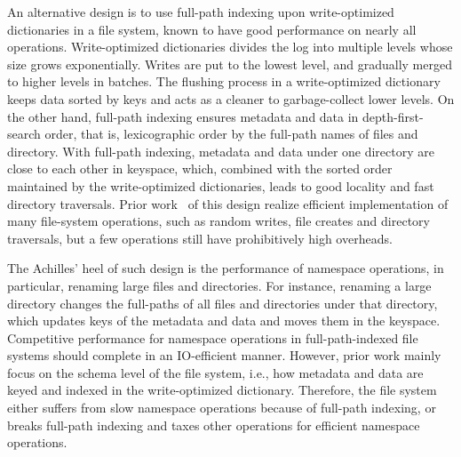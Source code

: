 An alternative design is to use full-path indexing upon write-optimized
dictionaries in a file system, known to have good performance on nearly all
operations.
Write-optimized dictionaries divides the log into multiple levels whose size
grows exponentially.
Writes are put to the lowest level, and gradually merged to higher levels in
batches.
The flushing process in a write-optimized dictionary keeps data sorted by keys
and acts as a cleaner to garbage-collect lower levels.
On the other hand, full-path indexing ensures metadata and data in
depth-first-search order, that is, lexicographic order by the full-path names
of files and directory.
With full-path indexing, metadata and data under one directory are close to each
other in keyspace, which, combined with the sorted order maintained by the
write-optimized dictionaries, leads to good locality and fast directory
traversals.
Prior work~\citep{betrfs1,betrfs1tos,betrfs2,betrfs2tos,betrfs3} of this design
realize efficient implementation of many file-system operations, such as random
writes, file creates and directory traversals,
but a few operations still have prohibitively high overheads.

The Achilles' heel of such design is the performance of namespace operations,
in particular, renaming large files and directories.
For instance, renaming a large directory changes the full-paths of all files
and directories under that directory, which updates keys of the metadata and
data and moves them in the keyspace.
Competitive performance for namespace operations in full-path-indexed file
systems should complete in an IO-efficient manner.
However, prior work mainly focus on the schema level of the file system, i.e.,
how metadata and data are keyed and indexed in the write-optimized dictionary.
Therefore, the file system either suffers from slow namespace operations because
of full-path indexing, or breaks full-path indexing and
taxes other operations for efficient namespace operations.

